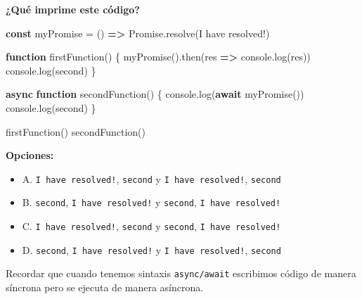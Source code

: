 \documentclass[
  letterpaper,
  DIV=11,
  numbers=noendperiod]{scrreprt}
\newenvironment{Shaded}{\begin{snugshade}}{\end{snugshade}}
\newcommand{\BuiltInTok}[1]{\textcolor[rgb]{0.00,0.23,0.31}{#1}}
\newcommand{\ControlFlowTok}[1]{\textcolor[rgb]{0.00,0.23,0.31}{\textbf{#1}}}
\newcommand{\FunctionTok}[1]{\textcolor[rgb]{0.28,0.35,0.67}{#1}}
\newcommand{\KeywordTok}[1]{\textcolor[rgb]{0.00,0.23,0.31}{\textbf{#1}}}
\newcommand{\NormalTok}[1]{\textcolor[rgb]{0.00,0.23,0.31}{#1}}
\newcommand{\OperatorTok}[1]{\textcolor[rgb]{0.37,0.37,0.37}{#1}}
\newcommand{\StringTok}[1]{\textcolor[rgb]{0.13,0.47,0.30}{#1}}
\providecommand{\tightlist}{%
  \setlength{\itemsep}{0pt}\setlength{\parskip}{0pt}}
\begin{document}
\textbf{¿Qué imprime este código?}

\begin{Shaded}
\begin{Highlighting}[]
\KeywordTok{const}\NormalTok{ myPromise }\OperatorTok{=}\NormalTok{ () }\KeywordTok{=\textgreater{}} \BuiltInTok{Promise}\OperatorTok{.}\FunctionTok{resolve}\NormalTok{(}\StringTok{\textquotesingle{}I have resolved!\textquotesingle{}}\NormalTok{)}

\KeywordTok{function} \FunctionTok{firstFunction}\NormalTok{() \{}
  \FunctionTok{myPromise}\NormalTok{()}\OperatorTok{.}\FunctionTok{then}\NormalTok{(res }\KeywordTok{=\textgreater{}} \BuiltInTok{console}\OperatorTok{.}\FunctionTok{log}\NormalTok{(res))}
  \BuiltInTok{console}\OperatorTok{.}\FunctionTok{log}\NormalTok{(}\StringTok{\textquotesingle{}second\textquotesingle{}}\NormalTok{)}
\NormalTok{\}}

\KeywordTok{async} \KeywordTok{function} \FunctionTok{secondFunction}\NormalTok{() \{}
  \BuiltInTok{console}\OperatorTok{.}\FunctionTok{log}\NormalTok{(}\ControlFlowTok{await} \FunctionTok{myPromise}\NormalTok{())}
  \BuiltInTok{console}\OperatorTok{.}\FunctionTok{log}\NormalTok{(}\StringTok{\textquotesingle{}second\textquotesingle{}}\NormalTok{)}
\NormalTok{\}}

\FunctionTok{firstFunction}\NormalTok{()}
\FunctionTok{secondFunction}\NormalTok{()}
\end{Highlighting}
\end{Shaded}

\textbf{Opciones:}

\begin{itemize}
\tightlist
\item
  A. \texttt{I\ have\ resolved!}, \texttt{second} y
  \texttt{I\ have\ resolved!}, \texttt{second}
\item
  B. \texttt{second}, \texttt{I\ have\ resolved!} y \texttt{second},
  \texttt{I\ have\ resolved!}
\item
  C. \texttt{I\ have\ resolved!}, \texttt{second} y \texttt{second},
  \texttt{I\ have\ resolved!}
\item
  D. \texttt{second}, \texttt{I\ have\ resolved!} y
  \texttt{I\ have\ resolved!}, \texttt{second}
\end{itemize}

\begin{tcolorbox}[enhanced jigsaw, left=2mm, toprule=.15mm, leftrule=.75mm, breakable, colback=white, coltitle=black, bottomtitle=1mm, arc=.35mm, rightrule=.15mm, colframe=quarto-callout-tip-color-frame, opacitybacktitle=0.6, toptitle=1mm, opacityback=0, titlerule=0mm, title=\textcolor{quarto-callout-tip-color}{\faLightbulb}\hspace{0.5em}{Pista}, bottomrule=.15mm, colbacktitle=quarto-callout-tip-color!10!white]

Recordar que cuando tenemos sintaxis \texttt{async/await} escribimos
código de manera síncrona pero se ejecuta de manera asíncrona.

\end{tcolorbox}
\end{document}
